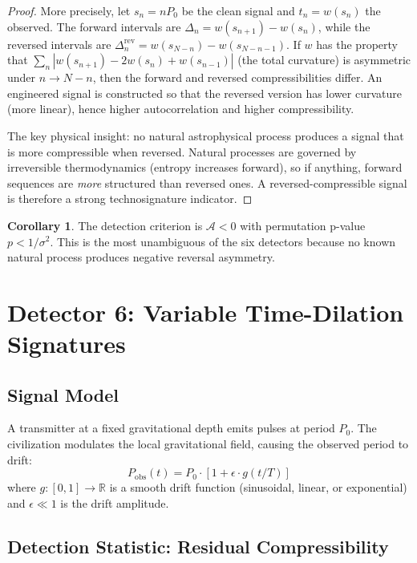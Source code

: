 \documentclass[11pt]{article}
\theoremstyle{definition}
\newtheorem{corollary}[theorem]{Corollary}
\begin{document}
\begin{proof}
More precisely, let $s_n = n P_0$ be the clean signal and $t_n = w(s_n)$ the observed. The forward intervals are $\Delta_n = w(s_{n+1}) - w(s_n)$, while the reversed intervals are $\Delta^{\text{rev}}_n = w(s_{N-n}) - w(s_{N-n-1})$. If $w$ has the property that $\sum_{n} |w(s_{n+1}) - 2w(s_n) + w(s_{n-1})|$ (the total curvature) is asymmetric under $n \to N-n$, then the forward and reversed compressibilities differ. An engineered signal is constructed so that the reversed version has lower curvature (more linear), hence higher autocorrelation and higher compressibility.

The key physical insight: no natural astrophysical process produces a signal that is more compressible when reversed. Natural processes are governed by irreversible thermodynamics (entropy increases forward), so if anything, forward sequences are \emph{more} structured than reversed ones. A reversed-compressible signal is therefore a strong technosignature indicator.
\end{proof}

\begin{corollary}
The detection criterion is $\mathcal{A} < 0$ with permutation p-value $p < 1/\sigma^2$. This is the most unambiguous of the six detectors because no known natural process produces negative reversal asymmetry.
\end{corollary}


\section{Detector 6: Variable Time-Dilation Signatures}

\subsection{Signal Model}

A transmitter at a fixed gravitational depth emits pulses at period $P_0$. The civilization modulates the local gravitational field, causing the observed period to drift:
\begin{equation}
P_{\text{obs}}(t) = P_0 \cdot \left[1 + \epsilon \cdot g(t/T)\right]
\end{equation}
where $g: [0,1] \to \mathbb{R}$ is a smooth drift function (sinusoidal, linear, or exponential) and $\epsilon \ll 1$ is the drift amplitude.

\subsection{Detection Statistic: Residual Compressibility}
\end{document}
